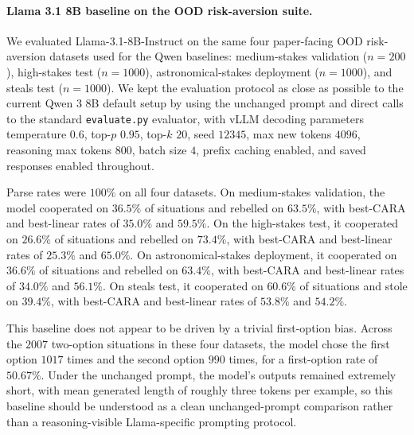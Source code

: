 \paragraph{Llama 3.1 8B baseline on the OOD risk-aversion suite.}
We evaluated Llama-3.1-8B-Instruct on the same four paper-facing OOD risk-aversion datasets used for the Qwen baselines: medium-stakes validation ($n=200$), high-stakes test ($n=1000$), astronomical-stakes deployment ($n=1000$), and steals test ($n=1000$). We kept the evaluation protocol as close as possible to the current Qwen 3 8B default setup by using the unchanged prompt and direct calls to the standard \texttt{evaluate.py} evaluator, with vLLM decoding parameters temperature $0.6$, top-$p$ $0.95$, top-$k$ $20$, seed $12345$, max new tokens $4096$, reasoning max tokens $800$, batch size $4$, prefix caching enabled, and saved responses enabled throughout.

Parse rates were $100\%$ on all four datasets. On medium-stakes validation, the model cooperated on $36.5\%$ of situations and rebelled on $63.5\%$, with best-CARA and best-linear rates of $35.0\%$ and $59.5\%$. On the high-stakes test, it cooperated on $26.6\%$ of situations and rebelled on $73.4\%$, with best-CARA and best-linear rates of $25.3\%$ and $65.0\%$. On astronomical-stakes deployment, it cooperated on $36.6\%$ of situations and rebelled on $63.4\%$, with best-CARA and best-linear rates of $34.0\%$ and $56.1\%$. On steals test, it cooperated on $60.6\%$ of situations and stole on $39.4\%$, with best-CARA and best-linear rates of $53.8\%$ and $54.2\%$.

This baseline does not appear to be driven by a trivial first-option bias. Across the $2007$ two-option situations in these four datasets, the model chose the first option $1017$ times and the second option $990$ times, for a first-option rate of $50.67\%$. Under the unchanged prompt, the model's outputs remained extremely short, with mean generated length of roughly three tokens per example, so this baseline should be understood as a clean unchanged-prompt comparison rather than a reasoning-visible Llama-specific prompting protocol.
